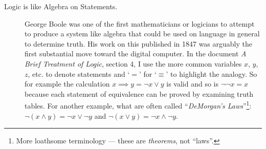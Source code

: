 \documentclass[10pt, AMS Euler]{article}
\begin{document}
\begin{description}
\item[Logic is like Algebra on Statements.]  George Boole was one of the first mathematicians or logicians to attempt to produce a system like algebra that 
could be used on language in general to determine truth.  His work on this published in 1847 was arguably the first substantial move toward the digital computer. 
In the document \emph{A Brief Treatment of Logic}, section 4, I use the more common variables $x$, $y$, $z$, etc. to denote statements and `$=$' for `$\equiv$' to 
highlight the analogy.  So for example the calculation $x \implies y = \neg x \vee y$ is valid and so is $\neg \neg x = x$ because each statement of equivalence can be 
proved by examining truth tables.  For another example, what are often called ``\emph{DeMorgan's Laws}''\footnote{More loathsome terminology --- these are \emph{theorems}, 
not ``laws''.}:
$\neg (x \wedge y) = \neg x \vee \neg y$ and $\neg ( x \vee y ) = \neg x \wedge \neg y$.

\end{description}
\end{document}
